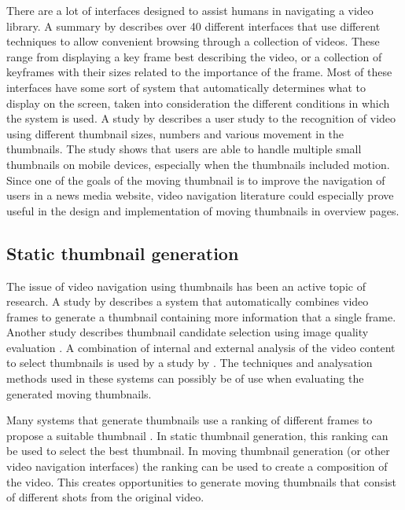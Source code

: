 \documentclass{../resources/acm_proc_article-sp}
\begin{document}
There are a lot of interfaces designed to assist humans in navigating a video library. A summary by \textcite{Schoeffmann:2010iw} describes over 40 different interfaces that use different techniques to allow convenient browsing through a collection of videos. These range from displaying a key frame best describing the video, or a collection of keyframes with their sizes related to the importance of the frame. Most of these interfaces have some sort of system that automatically determines what to display on the screen, taken into consideration the different conditions in which the system is used. A study by \textcite{Hurst:2011jx} describes a user study to the recognition of video using different thumbnail sizes, numbers and various movement in the thumbnails. The study shows that users are able to handle multiple small thumbnails on mobile devices, especially when the thumbnails included motion. Since one of the goals of the moving thumbnail is to improve the navigation of users in a news media website, video navigation literature could especially prove useful in the design and implementation of moving thumbnails in overview pages.

\subsection{Static thumbnail generation}

The issue of video navigation using thumbnails has been an active topic of research. A \citeyear{Kim:2015co} study by \textcite{Kim:2015co} describes a system that automatically combines video frames to generate a thumbnail containing more information that a single frame. Another study describes thumbnail candidate selection using image quality evaluation \cite{Zhang:2014jg}. A combination of internal and external analysis of the video content to select thumbnails is used by a study by \textcite{Liu:2015ux}. The techniques and analysation methods used in these systems can possibly be of use when evaluating the generated moving thumbnails.

Many systems that generate thumbnails use a ranking of different frames to propose a suitable thumbnail \cite{Choi:2015gm,Zhang:2012eo,Gao:2009dx}. In static thumbnail generation, this ranking can be used to select the best thumbnail. In moving thumbnail generation (or other video navigation interfaces) the ranking can be used to create a composition of the video. This creates opportunities to generate moving thumbnails that consist of different shots from the original video.
\end{document}
